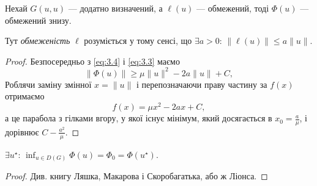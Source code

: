 \begin{lemma}
    Нехай $G(u, u)$ --- додатно визначений, а $\ell(u)$ --- обмежений, тоді $\Phi(u)$ --- обмежений знизу.
\end{lemma}
\begin{remark}
    Тут \textit{обмеженість} $\ell$ розуміється у тому сенсі, що $\exists a > 0$: $\|\ell(u)\| \le a \|u\|$.
\end{remark}
\begin{proof}
    Безпосередньо з \eqref{eq:3.4} і \eqref{eq:3.3} маємо
    \begin{equation}
        \label{eq:3.5}
        \|\Phi(u)\| \ge \mu \|u\|^2 - 2 a \|u\| + C,
    \end{equation}
    Роблячи заміну змінної $x = \|u\|$ і перепозначаючи праву частину за $f(x)$ отримаємо
    \begin{equation*}
        f(x) = \mu x^2 - 2 a x + C,
    \end{equation*}
    а це парабола з гілками вгору, у якої існує мінімум, який досягається в $x_0 = \frac{a}{\mu}$, і дорівнює $C - \frac{a^2}{\mu}$.
\end{proof}

\begin{corollary}
    $\exists u^\star$: $\inf_{u \in D(G)} \Phi(u) = \Phi_0 = \Phi(u^\star)$.
\end{corollary}
\begin{proof}
    Див. книгу Ляшка, Макарова і Скоробагатька, або ж Ліонса.    
\end{proof}

